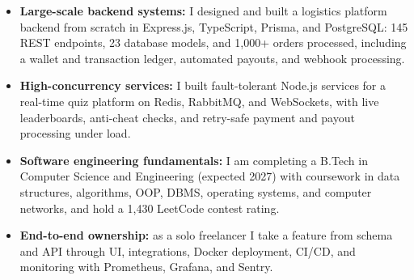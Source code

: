 \documentclass[]{cover}
\begin{document}


\currentdate{\today}



{\raggedright{}\fontsize{11pt}{13pt}\selectfont
\renewcommand{\labelitemi}{\textbullet}
\renewcommand{\labelitemii}{\textbullet}
\renewcommand{\labelitemiii}{\textbullet}
\begin{itemize}
    \item \textbf{Large-scale backend systems:} I designed and built a logistics platform backend from scratch in Express.js, TypeScript, Prisma, and PostgreSQL: 145 REST endpoints, 23 database models, and 1,000+ orders processed, including a wallet and transaction ledger, automated payouts, and webhook processing.
    \item \textbf{High-concurrency services:} I built fault-tolerant Node.js services for a real-time quiz platform on Redis, RabbitMQ, and WebSockets, with live leaderboards, anti-cheat checks, and retry-safe payment and payout processing under load.
    \item \textbf{Software engineering fundamentals:} I am completing a B.Tech in Computer Science and Engineering (expected 2027) with coursework in data structures, algorithms, OOP, DBMS, operating systems, and computer networks, and hold a 1,430 LeetCode contest rating.
    \item \textbf{End-to-end ownership:} as a solo freelancer I take a feature from schema and API through UI, integrations, Docker deployment, CI/CD, and monitoring with Prometheus, Grafana, and Sentry.
\end{itemize}\par}
\vspace{6pt}
\end{document}
